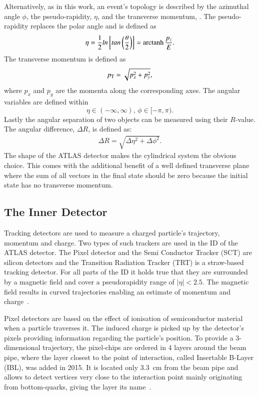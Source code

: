 Alternatively, as in this work, an event's topology is described by the azimuthal angle $\phi$, the pseudo-rapidity, $\eta$, and the transverse momentum, \pT. The pseudo-rapidity replaces the polar angle and is defined as
%
\begin{equation}
\eta = \frac{1}{2} ln\left[ tan\left(\frac{\theta}{2}\right)\right] \approx \operatorname{arctanh}\frac{p_z}{E}.
\end{equation}
%
The transverse momentum is defined as
%
\begin{equation}
p_{\text{T}} = \sqrt{p_x^2 + p_y^2},
\end{equation}
where $p_x$ and $p_y$ are the momenta along the corresponding axes. 
%
The angular variables are defined within
%
\begin{equation}
\eta \in (-\infty,\infty),\,
\phi \in [-\pi,\pi).
\end{equation}
%
Lastly the angular separation of two objects can be measured using their $R$-value. The angular difference, $\Delta R$, is defined as:
\begin{align}
\Delta R = \sqrt{\Delta \eta^2 + \Delta \phi^2}.
\end{align}
%
The shape of the ATLAS detector makes the cylindrical system the obvious choice. This comes with the additional benefit of a well defined transverse plane where the sum of all vectors in the final state should be zero because the initial state has no transverse momentum.



\subsection{The Inner Detector}

Tracking detectors are used to measure a charged particle's trajectory, momentum and charge. Two types of such trackers are used in the ID of the ATLAS detector. The Pixel detector and the Semi Conductor Tracker (SCT) are silicon detectors and the Transition Radiation Tracker (TRT) is a straw-based tracking detector. For all parts of the ID it holds true that they are surrounded by a magnetic field and cover a pseudorapidity range of $|\eta| < 2.5$. The magnetic field results in curved trajectories enabling an estimate of momentum and charge~\cite{leo}.

Pixel detectors are based on the effect of ionisation of semiconductor material when a particle traverses it. The induced charge is picked up by the detector's pixels providing information regarding the particle's position. To provide a 3-dimensional trajectory, the pixel-chips are ordered in 4 layers around the beam pipe, where the layer closest to the point of interaction, called Insertable B-Layer (IBL), was added in 2015. It is located only \SI{3.3}{\centi \metre} from the beam pipe and allows to detect vertices very close to the interaction point mainly originating from bottom-quarks, giving the layer its name~\cite{pixel_run2}.

